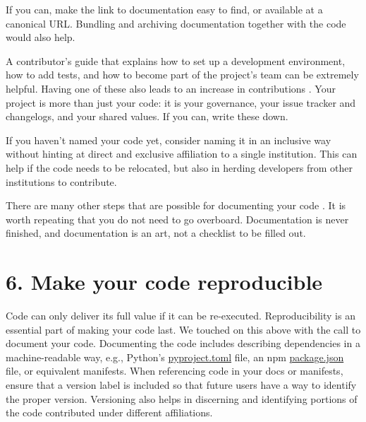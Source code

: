 \documentclass[10pt,letterpaper]{article}
\begin{document}
If you can, make the link to documentation easy to find, or available at a canonical URL.
Bundling and archiving documentation together with the code would also help.

A contributor's guide that explains how to set up a development environment,
how to add tests,
and how to become part of the project's team can be extremely helpful.
Having one of these also leads to an increase in contributions \cite{Sholler2019}.
Your project is more than just your code:
it is your governance,
your issue tracker and changelogs,
and your shared values.
If you can, write these down.

If you haven't named your code yet,
consider naming it in an inclusive way
without hinting at direct and exclusive affiliation to a single institution.
This can help if the code needs to be relocated,
but also in herding developers from other institutions to contribute.

There are many other steps that are possible for documenting your code \cite{Lee2018}.
It is worth repeating that you do not need to go overboard.
Documentation is never finished,
and documentation is an art,
not a checklist to be filled out.

\section*{6. Make your code reproducible}

Code can only deliver its full value if it can be re-executed.
Reproducibility is an essential part of making your code last.
We touched on this above with the call to document your code.
Documenting the code includes describing dependencies in a machine-readable way,
e.g., Python's \href{https://packaging.python.org/en/latest/guides/writing-pyproject-toml/}{pyproject.toml} file,
an npm \href{https://docs.npmjs.com/cli/v10/configuring-npm/package-json?v=true}{package.json} file,
or equivalent manifests.
When referencing code in your docs or manifests,
ensure that a version label is included
so that future users have a way to identify the proper version.
Versioning also helps in discerning and identifying portions of the code contributed under different affiliations.
\end{document}
